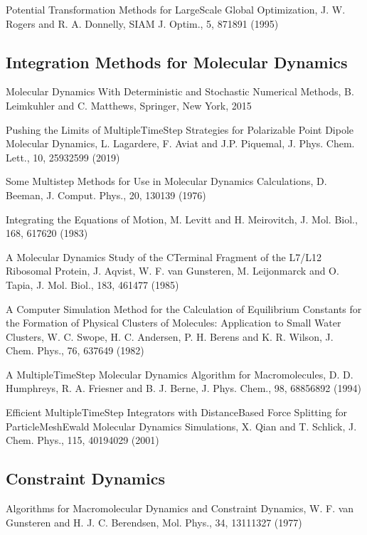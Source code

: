 \documentclass[letterpaper,11pt,english]{sphinxmanual}
\begin{document}
\sphinxAtStartPar
Potential Transformation Methods for Large\sphinxhyphen{}Scale Global Optimization, J. W. Rogers and R. A. Donnelly, SIAM J. Optim., 5, 871\sphinxhyphen{}891 (1995)


\subsection{Integration Methods for Molecular Dynamics}
\label{\detokenize{text/references:integration-methods-for-molecular-dynamics}}
\sphinxAtStartPar
Molecular Dynamics With Deterministic and Stochastic Numerical Methods, B. Leimkuhler and C. Matthews, Springer, New York, 2015

\sphinxAtStartPar
Pushing the Limits of Multiple\sphinxhyphen{}Time\sphinxhyphen{}Step Strategies for Polarizable Point Dipole Molecular Dynamics, L. Lagardere, F. Aviat and J.\sphinxhyphen{}P. Piquemal, J. Phys. Chem. Lett., 10, 2593\sphinxhyphen{}2599 (2019)

\sphinxAtStartPar
Some Multistep Methods for Use in Molecular Dynamics Calculations, D. Beeman, J. Comput. Phys., 20, 130\sphinxhyphen{}139 (1976)

\sphinxAtStartPar
Integrating the Equations of Motion, M. Levitt and H. Meirovitch, J. Mol. Biol., 168, 617\sphinxhyphen{}620 (1983)

\sphinxAtStartPar
A Molecular Dynamics Study of the C\sphinxhyphen{}Terminal Fragment of the L7/L12 Ribosomal Protein, J. Aqvist, W. F. van Gunsteren, M. Leijonmarck and O. Tapia, J. Mol. Biol., 183, 461\sphinxhyphen{}477 (1985)

\sphinxAtStartPar
A Computer Simulation Method for the Calculation of Equilibrium Constants for the Formation of Physical Clusters of Molecules: Application to Small Water Clusters, W. C. Swope, H. C. Andersen, P. H. Berens and K. R. Wilson, J. Chem. Phys., 76, 637\sphinxhyphen{}649 (1982)

\sphinxAtStartPar
A Multiple\sphinxhyphen{}Time\sphinxhyphen{}Step Molecular Dynamics Algorithm for Macromolecules, D. D. Humphreys, R. A. Friesner and B. J. Berne, J. Phys. Chem., 98, 6885\sphinxhyphen{}6892 (1994)

\sphinxAtStartPar
Efficient Multiple\sphinxhyphen{}Time\sphinxhyphen{}Step Integrators with Distance\sphinxhyphen{}Based Force Splitting for Particle\sphinxhyphen{}Mesh\sphinxhyphen{}Ewald Molecular Dynamics Simulations, X. Qian and T. Schlick, J. Chem. Phys., 115, 4019\sphinxhyphen{}4029 (2001)


\subsection{Constraint Dynamics}
\label{\detokenize{text/references:constraint-dynamics}}
\sphinxAtStartPar
Algorithms for Macromolecular Dynamics and Constraint Dynamics, W. F. van Gunsteren and H. J. C. Berendsen, Mol. Phys., 34, 1311\sphinxhyphen{}1327 (1977)
\end{document}

